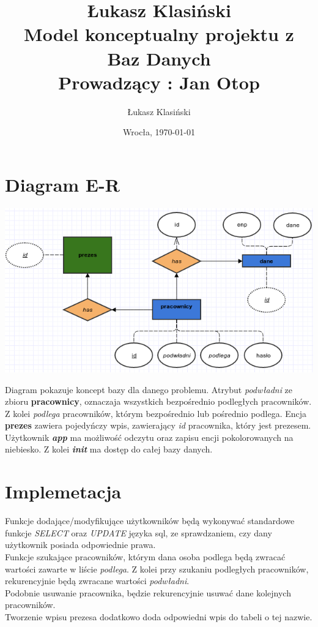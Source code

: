 \documentclass[11pt, wide]{article}
\author{Łukasz Klasiński}
\date{Wrocła, \today}
\title{Łukasz Klasiński\\\LARGE\textbf{Model konceptualny projektu z \\Baz Danych\\}
    Prowadzący : Jan Otop}
\begin{document}
    \maketitle
    \thispagestyle{empty}
    \section{Diagram E-R }
    \includegraphics[width=\textwidth]{er}    

    Diagram pokazuje koncept bazy dla danego problemu. Atrybut \textit{podwładni}
    ze zbioru \textbf{pracownicy}, oznaczaja wszystkich bezpośrednio podległych pracowników. Z kolei
    \textit{podlega} pracowników, którym bezpośrednio lub pośrednio podlega. 
    Encja \textbf{prezes} zawiera pojedyńczy wpis, zawierający \textit{id} pracownika, który
    jest prezesem.\\

    Użytkownik \textbf{\textit{app}} ma możliwość odczytu oraz zapisu encji pokolorowanych
    na niebiesko. Z kolei \textbf{\textit{init}} ma dostęp do całej bazy danych.

    \section{Implemetacja}
    Funkcje dodające/modyfikujące użytkowników będą wykonywać standardowe
    funkcje \textit{SELECT} oraz \textit{UPDATE} języka sql, ze sprawdzaniem, czy 
    dany użytkownik posiada odpowiednie prawa.\\    
    Funkcje szukające pracowników, którym dana osoba podlega będą zwracać wartości zawarte w liście \textit{podlega}. 
    Z kolei przy szukaniu podległych pracowników, rekurencyjnie będą zwracane wartości \textit{podwładni}.
    \\Podobnie usuwanie pracownika, będzie rekurencyjnie usuwać dane kolejnych pracowników.
    \\Tworzenie wpisu prezesa dodatkowo doda odpowiedni wpis do tabeli o tej nazwie.
\end{document}
